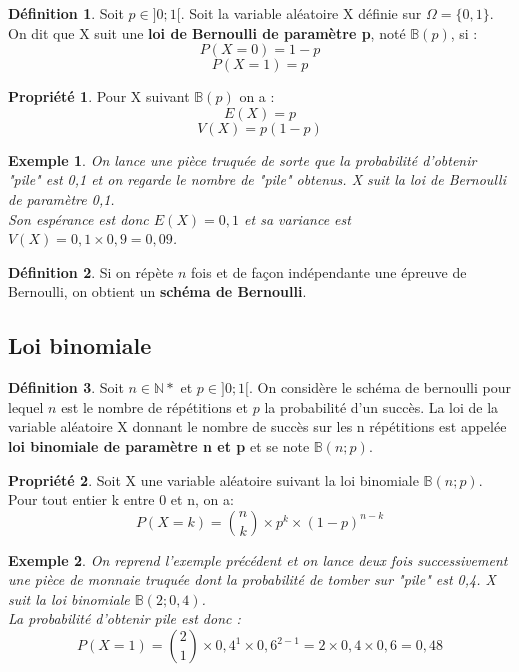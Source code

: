\documentclass[a4paper,12pt,final]{article}
\newtheorem{Ex}{Exemple}[section]
\theoremstyle{theorem}
\theoremstyle{definition}
\newtheorem{Propriete}{Propriété}[section]
\theoremstyle{definition}
\theoremstyle{definition}
\newtheorem{Def}{Définition}[section]
\begin{document}
	\begin{Def}
		Soit $p \in ]0;1[$. Soit la variable aléatoire X définie sur $\Omega = \{0,1\}$. On dit que X suit une \textbf{loi de Bernoulli de paramètre p}, noté $\mathbb{B} (p)$, si :
			\[P(X= 0) = 1-p\]
			\[P(X= 1) = p\]
	\end{Def}

	\begin{Propriete}
		Pour X suivant $\mathbb{B} (p)$ on a : 
		\[E(X) = p\]
		\[V(X) = p(1-p)\]
	\end{Propriete}

	\begin{Ex}
		On lance une pièce truquée de sorte que la probabilité d'obtenir "pile" est 0,1 et on regarde le nombre de "pile" obtenus. X suit la loi de Bernoulli de paramètre 0,1. \\
		Son espérance est donc $E(X) = 0,1$ et sa variance est $V(X)=0,1 \times 0,9 = 0,09$.
	\end{Ex}

	\begin{Def}
		Si on répète $n$ fois et de façon indépendante une épreuve de Bernoulli, on obtient un \textbf{schéma de Bernoulli}.
	\end{Def}


	\subsection{Loi binomiale}
	
	\begin{Def}
		Soit $n \in \mathbb{N}*$ et $p \in ]0;1[$. On considère le schéma de bernoulli pour lequel $n$ est le nombre de répétitions et $p$ la probabilité d'un succès. La loi de la variable aléatoire X donnant le nombre de succès sur les n répétitions est appelée \textbf{loi binomiale de paramètre n et p} et se note $\mathbb{B} (n;p)$.
	\end{Def}

	\begin{Propriete}
		Soit X une variable aléatoire suivant la loi binomiale $\mathbb{B} (n;p)$. \\
		Pour tout entier k entre 0 et n, on a:
		\[P(X=k) = \binom{n}{k} \times p^{k} \times (1-p)^{n-k}\]
	\end{Propriete}

	\begin{Ex}
		On reprend l'exemple précédent et on lance deux fois successivement une pièce de monnaie truquée dont la probabilité de tomber sur "pile" est 0,4. X suit la loi binomiale $\mathbb{B} (2;0,4)$.\\
		La probabilité d'obtenir pile est donc : 
		\[P(X=1) = \binom{2}{1} \times 0,4^{1} \times 0,6^{2-1} = 2 \times 0,4 \times 0,6 = 0,48\]
	\end{Ex}
\end{document}
